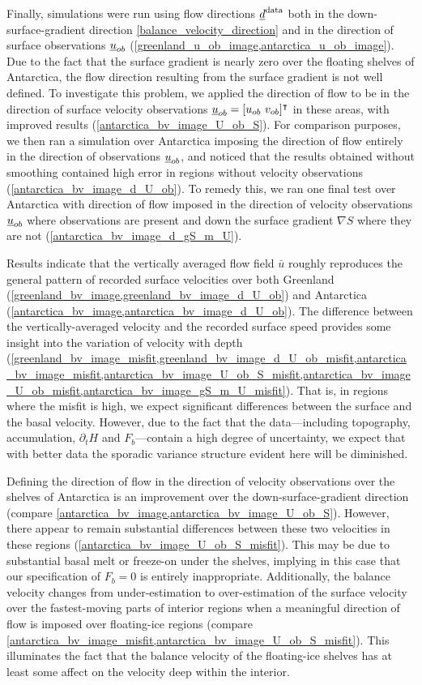 Finally, simulations were run using flow directions $\underline{d}^{\text{data}}$ both in the down-surface-gradient direction \cref{balance_velocity_direction} and in the direction of surface observations $\underline{u}_{ob}$ (\cref{greenland_u_ob_image,antarctica_u_ob_image}).
Due to the fact that the surface gradient is nearly zero over the floating shelves of Antarctica, the flow direction resulting from the surface gradient is not well defined.
To investigate this problem, we applied the direction of flow to be in the direction of surface velocity observations $\rankone{u}_{ob} = [u_{ob}\ v_{ob}]\T$ in these areas, with improved results (\cref{antarctica_bv_image_U_ob_S}).
For comparison purposes, we then ran a simulation over Antarctica imposing the direction of flow entirely in the direction of observations $\underline{u}_{ob}$, and noticed that the results obtained without smoothing contained high error in regions without velocity observations (\cref{antarctica_bv_image_d_U_ob}).
To remedy this, we ran one final test over Antarctica with direction of flow imposed in the direction of velocity observations $\underline{u}_{ob}$ where observations are present and down the surface gradient $\nabla S$ where they are not (\cref{antarctica_bv_image_d_gS_m_U}).

Results indicate that the vertically averaged flow field $\bar{u}$ roughly reproduces the general pattern of recorded surface velocities over both Greenland (\cref{greenland_bv_image,greenland_bv_image_d_U_ob}) and Antarctica (\cref{antarctica_bv_image,antarctica_bv_image_d_U_ob}).
The difference between the vertically-averaged velocity and the recorded surface speed provides some insight into the variation of velocity with depth (\cref{greenland_bv_image_misfit,greenland_bv_image_d_U_ob_misfit,antarctica_bv_image_misfit,antarctica_bv_image_U_ob_S_misfit,antarctica_bv_image_U_ob_misfit,antarctica_bv_image_gS_m_U_misfit}).
That is, in regions where the misfit is high, we expect significant differences between the surface and the basal velocity.
However, due to the fact that the data---including topography, accumulation, $\partial_t H$ and $F_b$---contain a high degree of uncertainty, we expect that with better data the sporadic variance structure evident here will be diminished.

Defining the direction of flow in the direction of velocity observations over the shelves of Antarctica is an improvement over the down-surface-gradient direction (compare \cref{antarctica_bv_image,antarctica_bv_image_U_ob_S}).
However, there appear to remain substantial differences between these two velocities in these regions (\cref{antarctica_bv_image_U_ob_S_misfit}).
This may be due to substantial basal melt or freeze-on under the shelves, implying in this case that our specification of $F_b = 0$ is entirely inappropriate.  Additionally, the balance velocity changes from under-estimation to over-estimation of the surface velocity over the fastest-moving parts of interior regions when a meaningful direction of flow is imposed over floating-ice regions (compare \cref{antarctica_bv_image_misfit,antarctica_bv_image_U_ob_S_misfit}).
This illuminates the fact that the balance velocity of the floating-ice shelves has at least some affect on the velocity deep within the interior.

